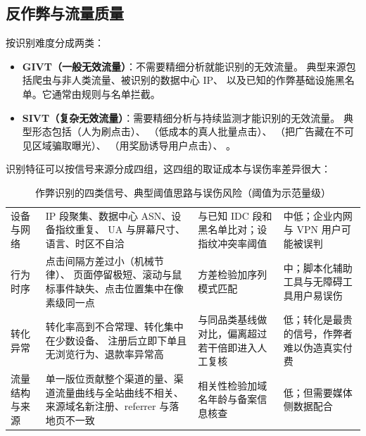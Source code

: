 \subsection{反作弊与流量质量}

 按识别难度分成两类：

\begin{itemize}
  \item \textbf{GIVT（一般无效流量）}：不需要精细分析就能识别的无效流量。
        典型来源包括爬虫与非人类流量、被识别的数据中心 IP、
        以及已知的作弊基础设施黑名单。它通常由规则与名单拦截。
  \item \textbf{SIVT（复杂无效流量）}：需要精细分析与持续监测才能识别的无效流量。
        典型形态包括（人为刷点击）、
        （低成本的真人批量点击）、
        （把广告藏在不可见区域骗取曝光）、
        （用奖励诱导用户点击）、
        。
\end{itemize}

识别特征可以按信号来源分成四组，这四组的取证成本与误伤率差异很大：

\begin{table}[htbp]
\centering
\caption{作弊识别的四类信号、典型阈值思路与误伤风险（阈值为示范量级）}
\label{tab:ivt-signals}
\small
\begin{tabularx}{\linewidth}{L{1.8cm} L{4.5cm} L{2.6cm} Y}
\toprule
{} &  &  &  \\
\midrule
设备与网络 & IP 段聚集、数据中心 ASN、设备指纹重复、
UA 与屏幕尺寸、语言、时区不自洽 & 与已知 IDC 段和黑名单比对；设指纹冲突率阈值 &
中低；企业内网与 VPN 用户可能被误判 \\
\addlinespace
行为时序 & 点击间隔方差过小（机械节律）、
页面停留极短、滚动与鼠标事件缺失、点击位置集中在像素级同一点 &
方差检验加序列模式匹配 & 中；脚本化辅助工具与无障碍工具用户易误伤 \\
\addlinespace
转化异常 & 转化率高到不合常理、转化集中在少数设备、
注册后立即下单且无浏览行为、退款率异常高 &
与同品类基线做对比，偏离超过若干倍即进入人工复核 & 低；转化是最贵的信号，作弊者难以伪造真实付费 \\
\addlinespace
流量结构与来源 & 单一版位贡献整个渠道的量、渠道流量曲线与全站曲线不相关、
来源域名新注册、referrer 与落地页不一致 &
相关性检验加域名年龄与备案信息核查 & 低；但需要媒体侧数据配合 \\
\bottomrule
\end{tabularx}
\end{table}

